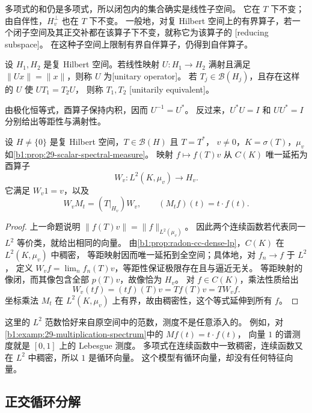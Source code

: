 多项式的和仍是多项式，所以闭包内的集合确实是线性子空间。
它在 \(T\) 下不变；由自伴性，\(H_v^\perp\) 也在 \(T\) 下不变。
一般地，对复 Hilbert 空间上的有界算子，若一个闭子空间及其正交补都在该算子下不变，就称它为该算子的
[reducing subspace]。
在这种子空间上限制有界自伴算子，仍得到自伴算子。

\begin{definition}[酉算子与酉等价]
\label{b1:def:29-unitary-equivalence}
设 \(H_1,H_2\) 是复 Hilbert 空间。若线性映射 \(U:H_1\to H_2\)
满射且满足 \(\|Ux\|=\|x\|\)，则称 \(U\) 为[unitary operator]。
若 \(T_j\in\mathcal B(H_j)\)，且存在这样的 \(U\) 使 \(UT_1=T_2U\)，
则称 \(T_1,T_2\) [unitarily equivalent]。
\end{definition}

由极化恒等式，酉算子保持内积，因而 \(U^{-1}=U^*\)。
反过来，\(U^*U=I\) 和 \(UU^*=I\) 分别给出等距性与满射性。

\begin{theorem}[循环子空间上的乘法表示]
\label{b1:thm:29-cyclic-representation}
设 \(H\ne\{0\}\) 是复 Hilbert 空间，\(T\in\mathcal B(H)\) 且 \(T=T^*\)，
\(v\ne0\)，\(K=\sigma(T)\)，\(\mu_v\) 如\cref{b1:prop:29-scalar-spectral-measure}。
映射 \(f\mapsto f(T)v\) 从 \(C(K)\) 唯一延拓为酉算子
\[
 W_v:L^2(K,\mu_v)\longrightarrow H_v.
\]
它满足 \(W_v1=v\)，以及
\[
 W_v M_t=(T|_{H_v})W_v,
 \qquad (M_t f)(t)=t\cdot f(t).
\]
\end{theorem}
\begin{proof}
上一命题说明 \(\|f(T)v\|=\|f\|_{L^2(\mu_v)}\)。
因此两个连续函数若代表同一 \(L^2\) 等价类，就给出相同的向量。
由\cref{b1:prop:radon-cc-dense-lp}，\(C(K)\) 在 \(L^2(K,\mu_v)\) 中稠密，
等距映射因而唯一延拓到全空间；具体地，对 \(f_n\to f\) 于 \(L^2\)，
定义 \(W_vf=\lim_n f_n(T)v\)，等距性保证极限存在且与逼近无关。
等距映射的像闭，而其像包含全部 \(p(T)v\)，故像恰为 \(H_v\)。
对 \(f\in C(K)\)，乘法性质给出
\[
 W_v(tf)=(tf)(T)v=T f(T)v=T W_vf.
\]
坐标乘法 \(M_t\) 在 \(L^2(K,\mu_v)\) 上有界，故由稠密性，这个等式延伸到所有 \(f\)。
\end{proof}

这里的 \(L^2\) 范数恰好来自原空间中的范数，测度不是任意添入的。
例如，对\cref{b1:examp:29-multiplication-spectrum}中的 \(Mf(t)=t\cdot f(t)\)，
向量 \(1\) 的谱测度就是 \([0,1]\) 上的 Lebesgue 测度。
多项式在连续函数中一致稠密，连续函数又在 \(L^2\) 中稠密，所以 \(1\) 是循环向量。
这个模型有循环向量，却没有任何特征向量。

\subsection{正交循环分解}
\label{b1:subsec:290303}

